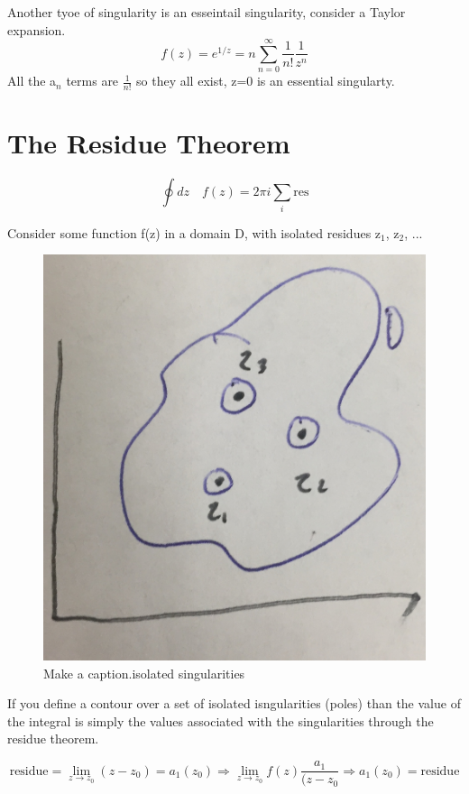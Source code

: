 \documentclass{article}
\newcommand{\be}{\begin{equation}}
\newcommand{\ee}{\end{equation}}
\begin{document}
Another tyoe of singularity is an esseintail singularity, consider a Taylor expansion.
\be
f(z) = e^{1/z} =n\sum_{n=0}^\infty \frac{1}{n!}\frac{1}{z^n}
\ee
All the a$_n$ terms are $\frac{1}{n!}$ so they all exist, z=0 is an essential singularty. 

\section*{The Residue Theorem}
\be
\oint dz \quad f(z) = 2\pi i\sum_i \text{res}
\ee

Consider some function f(z) in a domain D, with isolated residues z$_1$, z$_2$, ...

\begin{figure}[H]
  \centering
    \includegraphics[scale=0.2]{Figures/res.png}
    \caption{Make a caption.isolated singularities} 
\end{figure}

If you define a contour over a set of isolated isngularities (poles) than the value of the integral is simply the values associated with the singularities through the residue theorem. 

\be
\text{residue} = \lim_{z \rightarrow z_0}{(z-z_0)} = a_1(z_0) \Rightarrow \lim_{z \rightarrow z_0}{f(z)} \frac{a_1}{(z-z_0} \Rightarrow a_1(z_0) = \text{residue}
\ee
\end{document}

